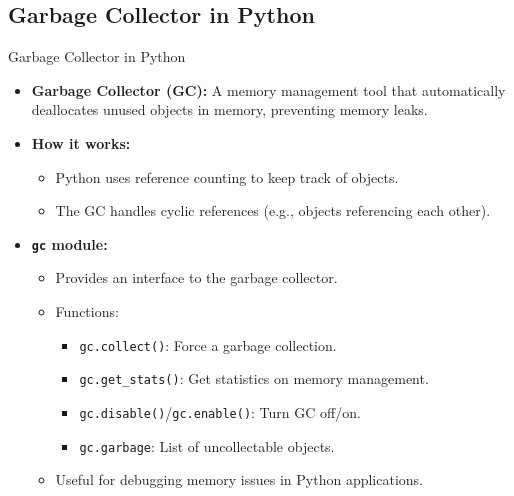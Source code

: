 \documentclass[10pt]{beamer}
\let\olditem\item
\renewcommand\item{\olditem\justifying}
\begin{document}
	\subsection{Garbage Collector in Python}
	\begin{frame}{Garbage Collector in Python}
		\begin{itemize}
			\item \textbf{Garbage Collector (GC):} 
			A memory management tool that automatically deallocates unused objects in memory, preventing memory leaks.
			\item \textbf{How it works:}
			\begin{itemize}
				\item Python uses reference counting to keep track of objects.
				\item The GC handles cyclic references (e.g., objects referencing each other).
			\end{itemize}
			\item \textbf{\texttt{gc} module:}
			\begin{itemize}
				\item Provides an interface to the garbage collector.
				\item Functions:
				\begin{itemize}
					\item \texttt{gc.collect()}: Force a garbage collection.
					\item \texttt{gc.get\_stats()}: Get statistics on memory management.
					\item \texttt{gc.disable()}/\texttt{gc.enable()}: Turn GC off/on.
					\item \texttt{gc.garbage}: List of uncollectable objects.
				\end{itemize}
				\item Useful for debugging memory issues in Python applications.
			\end{itemize}
		\end{itemize}
	\end{frame}
	
\end{document}
